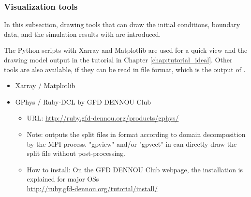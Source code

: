 \subsubsection{Visualization tools}

In this subsection, drawing tools that can draw the initial conditions, boundary data, and the simulation results with \scaledg are introduced.

The Python scripts with Xarray and Matplotlib are used for a quick view
and the drawing model output in the tutorial in Chapter \ref{chap:tutorial_ideal}.
Other tools are also available,
if they can be read in \netcdf file format, which is the output of \scaledg.

\begin{itemize}
\item Xarray / Matplotlib

\item GPhys / Ruby-DCL by GFD DENNOU Club
 \begin{itemize}
  \item URL: \url{http://ruby.gfd-dennou.org/products/gphys/}
  \item Note: \scalelib outputs the split files
  in {\netcdf} format according to domain decomposition by the MPI process.
  "gpview" and/or "gpvect" in {\gphys} can directly draw the split file without post-processing.
  \item How to install:
  On the GFD DENNOU Club webpage, the installation is explained for major OSs\\
  \url{http://ruby.gfd-dennou.org/tutorial/install/}\\
   \end{itemize}
\end{itemize}


